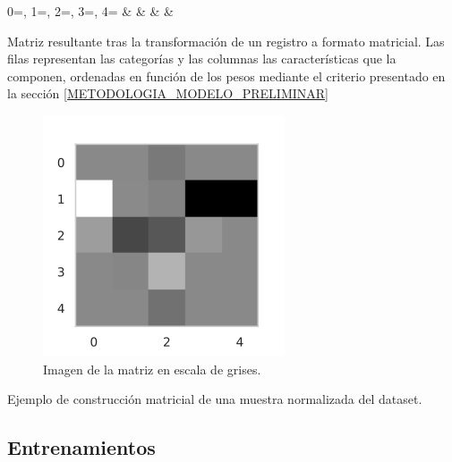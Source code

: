 \documentclass{uathesis-es}
\begin{document}
{\begin{table}[H]
\begin{subtable}
				{0=\cero, 1=\one, 2=\two, 3=\three, 4=\four}{%
					\cero & \one & \two & \three &  \four
				}
				\captionsetup{singlelinecheck = false, format= hang, justification=centering, font=footnotesize, labelsep=space}
				\caption{Matriz resultante tras la transformación de un registro a formato matricial. Las filas representan las categorías y las columnas las características que la componen, ordenadas en función de los pesos mediante el criterio presentado en la sección \ref{METODOLOGIA_MODELO_PRELIMINAR}}
				\label{ProcesoMatriz:Array}
			\end{subtable}
			\hspace{5em}
			\begin{subfigure}
				\centering
				\includegraphics[scale=0.5]{Figures/TFM/accidente_fatal.png}
				\captionsetup{singlelinecheck = false, format= hang, justification=centering, font=footnotesize, labelsep=space}
				\caption{Imagen de la matriz en escala de grises.}
				\label{ProcesoMatriz:VisualizacionDeMatriz}
			\end{subfigure}
			\caption{Ejemplo de construcción matricial de una muestra normalizada del dataset.}
			\label{ProcesoMatriz}
		\end{table}
		
		
		
		\subsection*{Entrenamientos}
		
}
\end{document}

